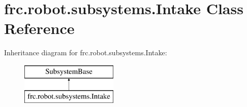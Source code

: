\hypertarget{classfrc_1_1robot_1_1subsystems_1_1_intake}{}\section{frc.\+robot.\+subsystems.\+Intake Class Reference}
\label{classfrc_1_1robot_1_1subsystems_1_1_intake}
Inheritance diagram for frc.\+robot.\+subsystems.\+Intake\+:\begin{figure}[H]
\begin{center}
\leavevmode
\includegraphics[height=2.000000cm]{classfrc_1_1robot_1_1subsystems_1_1_intake}
\end{center}
\end{figure}
